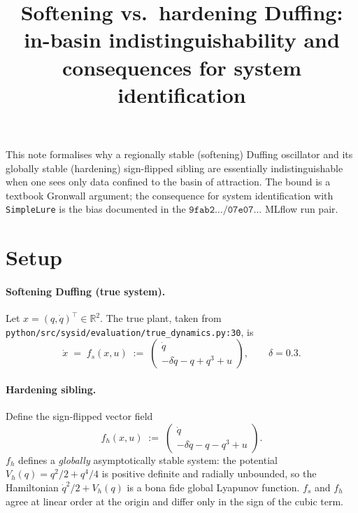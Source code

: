 \documentclass[11pt]{article}
\title{Softening vs.\ hardening Duffing: in-basin
       indistinguishability and consequences for system
       identification}
\author{}
\date{}
\newcommand{\R}{\mathbb{R}}
\begin{document}
\maketitle

\noindent
This note formalises why a regionally stable (softening) Duffing
oscillator and its globally stable (hardening) sign-flipped sibling
are essentially indistinguishable when one sees only data confined
to the basin of attraction. The bound is a textbook Gronwall
argument; the consequence for system identification with
\texttt{SimpleLure} is the bias documented in the
\(\texttt{9fab2}\dots/\texttt{07e07}\dots\) MLflow run pair.

\section{Setup}

\paragraph{Softening Duffing (true system).}
Let \(x = (q, \dot q)^\top \in \R^2\). The true plant, taken from
\texttt{python/src/sysid/evaluation/true\_dynamics.py:30}, is
\begin{equation}
\dot x \;=\; f_s(x, u) \;:=\;
\begin{pmatrix} \dot q \\
                -\delta \dot q - q + q^{3} + u
\end{pmatrix},
\qquad \delta = 0{.}3.
\label{eq:fs}
\end{equation}

\paragraph{Hardening sibling.}
Define the sign-flipped vector field
\begin{equation}
f_h(x, u) \;:=\;
\begin{pmatrix} \dot q \\
                -\delta \dot q - q - q^{3} + u
\end{pmatrix}.
\label{eq:fh}
\end{equation}
\(f_h\) defines a \emph{globally} asymptotically stable system:
the potential \(V_h(q) = q^2/2 + q^4/4\) is positive definite and
radially unbounded, so the Hamiltonian \(\dot q^2/2 + V_h(q)\) is a
bona fide global Lyapunov function. \(f_s\) and \(f_h\) agree at
linear order at the origin and differ only in the sign of the cubic
term.
\end{document}
